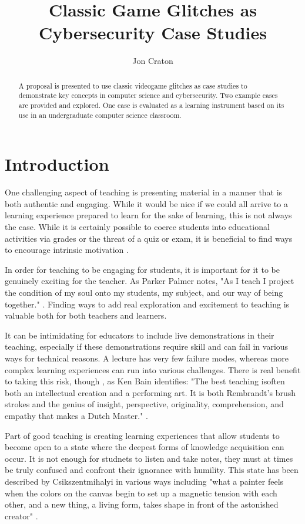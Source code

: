 \documentclass[letterpaper]{article}
\title{Classic Game Glitches as Cybersecurity Case Studies}
\author[1]{Jon Craton}
\affil[1]{Anderson University, Anderson, IN}
\date{} %
\begin{document}
\maketitle

\begin{abstract}
A proposal is presented to use classic videogame glitches as case studies to demonstrate key concepts in computer science and cybersecurity. Two example cases are provided and explored. One case is evaluated as a learning instrument based on its use in an undergraduate computer science classroom.
\end{abstract}

\section{Introduction}
One challenging aspect of teaching is presenting material in a manner that is both authentic and engaging. While it would be nice if we could all arrive to a learning experience prepared to learn for the sake of learning, this is not always the case. While it is certainly possible to coerce students into educational activities via grades or the threat of a quiz or exam, it is beneficial to find ways to encourage intrinsic motivation \cite{deci2013intrinsic}.

In order for teaching to be engaging for students, it is important for it to be genuinely exciting for the teacher. As Parker Palmer notes, "As I teach I project the condition of my soul onto my students, my subject, and our way of being together." \cite{palmer2000courage}. Finding ways to add real exploration and excitement to teaching is valuable both for both teachers and learners.

It can be intimidating for educators to include live demonstrations in their teaching, especially if these demonstrations require skill and can fail in various ways for technical reasons. A lecture has very few failure modes, whereas more complex learning experiences can run into various challenges. There is real benefit to taking this risk, though , as Ken Bain identifies: "The best teaching isoften both an intellectual creation and a performing art. It is both Rembrandt’s brush strokes and the genius of insight, perspective, originality, comprehension, and empathy that makes a Dutch Master." \cite{bain2004best}.

Part of good teaching is creating learning experiences that allow students to become open to a state where the deepest forms of knowledge acquisition can occur. It is not enough for studnets to listen and take notes, they must at times be truly confused and confront their ignorance with humility. This state has been described by Csikszentmihalyi in various ways including  "what a painter feels when the colors on the canvas begin to set up a magnetic tension with each other, and a new thing, a living form, takes shape in front of the astonished creator" \cite{csikszentmihalyi1990flow}.
\end{document}
